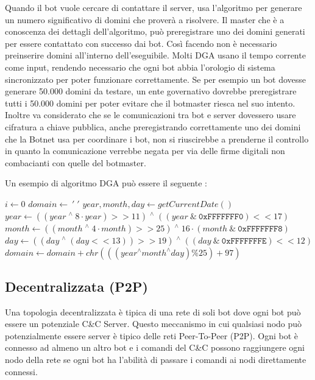 Quando il bot vuole cercare di contattare il server, usa l'algoritmo per generare un numero significativo di domini che proverà a risolvere. Il master che è a conoscenza dei dettagli dell'algoritmo, può preregistrare uno dei domini generati per essere contattato con successo dai bot.
Così facendo non è necessario preinserire domini all'interno dell'eseguibile.  Molti DGA usano il tempo corrente come input, rendendo necessario che ogni bot abbia l'orologio di sistema sincronizzato per poter funzionare correttamente. 
Se per esempio un bot dovesse generare 50.000 domini da testare, un ente governativo dovrebbe preregistrare tutti i 50.000 domini per poter evitare che il botmaster riesca nel suo intento. Inoltre va considerato che se le comunicazioni tra bot e server dovessero usare cifratura a chiave pubblica, anche preregistrando correttamente uno dei domini che la Botnet usa per coordinare i bot, non si riuscirebbe a prenderne il controllo in quanto la comunicazione verrebbe negata per via delle firme digitali non combacianti con quelle del botmaster.

Un esempio di algoritmo DGA può essere il seguente \cite{inproceedings}:

\begin{algorithmic}[1]
    \State $i \gets 0$
    \State $domain \gets \:  '\;'$
    \State $year, month, day \gets getCurrentDate()$
        \State $year \gets ((year \; ^  \wedge \; 8 \cdot year) >> 11) \; ^\wedge \; ((year \: \& \: \texttt{0xFFFFFFF0}) << 17) $
        \State $month \gets ((month   \;^ \wedge \; 4 \cdot month) >> 25) \; ^ \wedge \; 16 \cdot (month \: \& 
 \: \texttt{0xFFFFFFF8}) $
        \State $day \gets ((day \;^ \wedge \;(day << 13)) >> 19) \;^\wedge \; ((day \:\& \:\texttt{0xFFFFFFFE}) << 12) $
        \State $domain \gets domain + chr(((year ^\wedge month ^\wedge day) \% 25) + 97) $
    \EndWhile
\end{algorithmic}

\subsection{Decentralizzata (P2P)}
\label{TopologiaDecentralizzata}
Una topologia decentralizzata è tipica di una rete di soli bot dove ogni bot può essere un potenziale C\&C Server. Questo meccanismo in cui qualsiasi nodo può potenzialmente essere server è tipico delle reti Peer-To-Peer (P2P).
Ogni bot è connesso ad almeno un altro bot e i comandi del C\&C possono raggiungere ogni nodo della rete se ogni bot ha l'abilità di passare i comandi ai nodi direttamente connessi.


